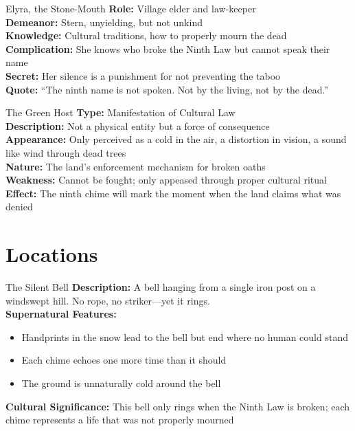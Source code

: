 \documentclass[11pt]{article}
\begin{document}
\begin{npcbox}{Elyra, the Stone-Mouth}
    \textbf{Role:} Village elder and law-keeper \\
    \textbf{Demeanor:} Stern, unyielding, but not unkind \\
    \textbf{Knowledge:} Cultural traditions, how to properly mourn the dead \\
    \textbf{Complication:} She knows who broke the Ninth Law but cannot speak their name \\
    \textbf{Secret:} Her silence is a punishment for not preventing the taboo \\
    \textbf{Quote:} ``The ninth name is not spoken. Not by the living, not by the dead.''
\end{npcbox}

\begin{npcbox}{The Green Host}
    \textbf{Type:} Manifestation of Cultural Law \\
    \textbf{Description:} Not a physical entity but a force of consequence \\
    \textbf{Appearance:} Only perceived as a cold in the air, a distortion in vision, a sound like wind through dead trees \\
    \textbf{Nature:} The land's enforcement mechanism for broken oaths \\
    \textbf{Weakness:} Cannot be fought; only appeased through proper cultural ritual \\
    \textbf{Effect:} The ninth chime will mark the moment when the land claims what was denied
\end{npcbox}

\section*{Locations}

\begin{locationbox}{The Silent Bell}
    \textbf{Description:} A bell hanging from a single iron post on a windswept hill. No rope, no striker---yet it rings. \\
    \textbf{Supernatural Features:}
    \begin{itemize}
        \item Handprints in the snow lead to the bell but end where no human could stand
        \item Each chime echoes one more time than it should
        \item The ground is unnaturally cold around the bell
    \end{itemize}
    \textbf{Cultural Significance:} This bell only rings when the Ninth Law is broken; each chime represents a life that was not properly mourned
\end{locationbox}
\end{document}
